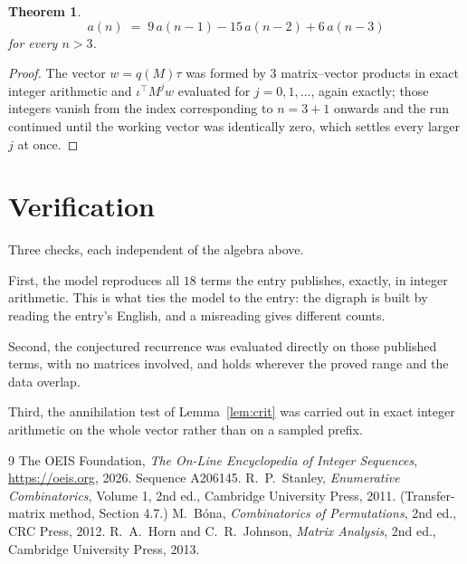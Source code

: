 \documentclass[11pt,a4paper]{article}
\theoremstyle{plain}
\newtheorem{theorem}{Theorem}
\theoremstyle{definition}
\begin{document}
\begin{theorem}
\[
a(n)\;=\;9\,a(n-1) - 15\,a(n-2) + 6\,a(n-3)
\]
for every $n>3$.
\end{theorem}

\begin{proof}
The vector $w=q(M)\tau$ was formed by $3$ matrix--vector products in exact integer
arithmetic and $\iota^{\!\top}M^{j}w$ evaluated for $j=0,1,\dots$, again exactly; those
integers vanish from the index corresponding to $n=3+1$ onwards and the run continued
until the working vector was identically zero, which settles every larger $j$ at once.
\end{proof}

\section{Verification}

Three checks, each independent of the algebra above.

First, the model reproduces all $18$ terms the entry publishes, exactly, in integer
arithmetic. This is what ties the model to the entry: the digraph is built by reading the
entry's English, and a misreading gives different counts.

Second, the conjectured recurrence was evaluated directly on those published terms, with no
matrices involved, and holds wherever the proved range and the data overlap.

Third, the annihilation test of Lemma~\ref{lem:crit} was carried out in exact integer
arithmetic on the whole vector rather than on a sampled prefix.

\begin{thebibliography}{9}
 The OEIS Foundation, \emph{The On-Line Encyclopedia of Integer
Sequences}, \url{https://oeis.org}, 2026. Sequence A206145.
 R.~P.~Stanley, \emph{Enumerative Combinatorics}, Volume 1, 2nd ed.,
Cambridge University Press, 2011. (Transfer-matrix method, Section 4.7.)
 M.~B\'ona, \emph{Combinatorics of Permutations}, 2nd ed., CRC
Press, 2012.
 R.~A.~Horn and C.~R.~Johnson, \emph{Matrix Analysis}, 2nd ed., Cambridge
University Press, 2013.
\end{thebibliography}
\end{document}
